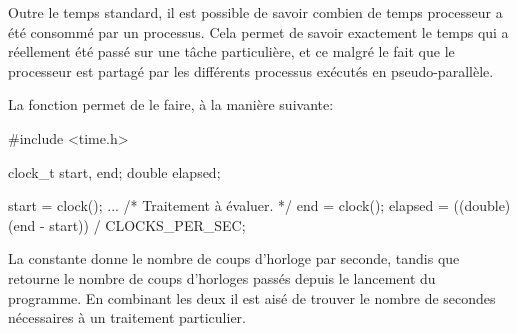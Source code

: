 Outre le temps standard, il est possible de savoir combien de temps processeur a été consommé par un processus. Cela permet de savoir exactement le temps qui a réellement été passé sur une tâche particulière, et ce malgré le fait que le processeur est partagé par les différents processus exécutés en pseudo-parallèle.

La fonction  permet de le faire, à la manière suivante:

\begin{codeblock}[title=Clock]
#include <time.h>

clock_t start, end;
double elapsed;

start = clock();
... /* Traitement à évaluer. */
end = clock();
elapsed = ((double) (end - start)) / CLOCKS_PER_SEC;
\end{codeblock}

La constante  donne le nombre de coups d'horloge par seconde, tandis que  retourne le nombre de coups d'horloges passés depuis le lancement du programme. En combinant les deux il est aisé de trouver le nombre de secondes nécessaires à un traitement particulier.
